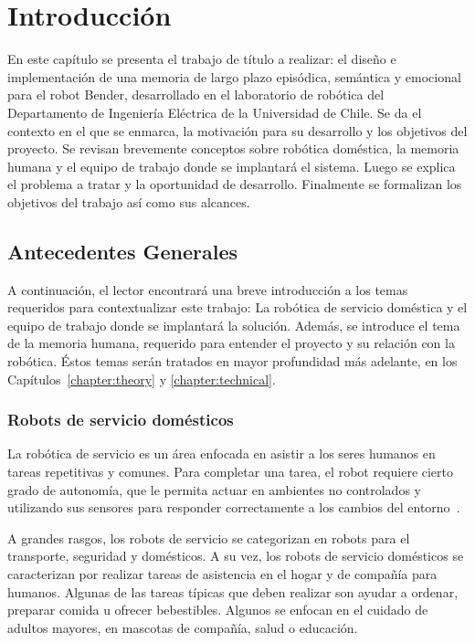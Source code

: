 \chapter{Introducción}\label{chapter:introduction}

En este capítulo se presenta el trabajo de título a realizar: el diseño e implementación de una memoria de largo plazo episódica, semántica y emocional para el robot Bender, desarrollado en el laboratorio de robótica del Departamento de Ingeniería Eléctrica de la Universidad de Chile. Se da el contexto en el que se enmarca, la motivación para su desarrollo y los objetivos del proyecto. Se revisan brevemente conceptos sobre robótica doméstica, la memoria humana y el equipo de trabajo donde se implantará el sistema. Luego se explica el problema a tratar y la oportunidad de desarrollo. Finalmente se formalizan los objetivos del trabajo así como sus alcances.


\section{Antecedentes Generales}

A continuación, el lector encontrará una breve introducción a los temas requeridos para contextualizar este trabajo: La robótica de servicio doméstica y el equipo de trabajo donde se implantará la solución. Además, se introduce el tema de la memoria humana, requerido para entender el proyecto y su relación con la robótica. Éstos temas serán tratados en mayor profundidad más adelante, en los Capítulos~\ref{chapter:theory} y \ref{chapter:technical}.


\subsection{Robots de servicio domésticos}

La robótica de servicio es un área enfocada en asistir a los seres humanos en tareas repetitivas y comunes. Para completar una tarea, el robot requiere cierto grado de autonomía, que le permita actuar en ambientes no controlados y utilizando sus sensores para responder correctamente a los cambios del entorno~\cite{IFR}.

A grandes rasgos, los robots de servicio se categorizan en robots para el transporte, seguridad y domésticos. A su vez, los robots de servicio domésticos se caracterizan por realizar tareas de asistencia en el hogar y de compañía para humanos. Algunas de las tareas típicas que deben realizar son ayudar a ordenar, preparar comida u ofrecer bebestibles. Algunos se enfocan en el cuidado de adultos mayores, en mascotas de compañía, salud o educación.

